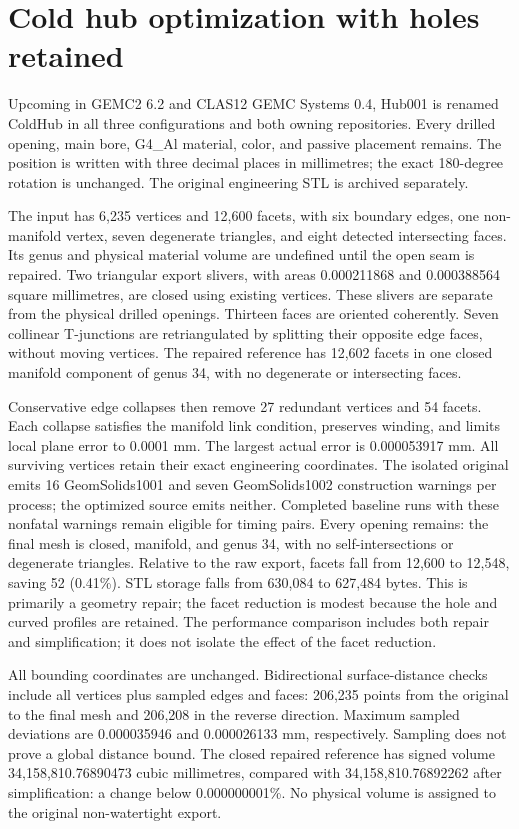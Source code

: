 \FloatBarrier
\section{Cold hub optimization with holes retained}
\label{sec:cold-hub}

Upcoming in GEMC2 6.2 and CLAS12 GEMC Systems 0.4, Hub001 is renamed ColdHub in all three configurations and
both owning repositories. Every drilled opening, main bore, G4\_Al material, color, and passive placement
remains. The position is written with three decimal places in millimetres; the exact 180-degree rotation is
unchanged. The original engineering STL is archived separately.

The input has 6,235 vertices and 12,600 facets, with six boundary edges, one non-manifold vertex, seven
degenerate triangles, and eight detected intersecting faces. Its genus and physical material volume are
undefined until the open seam is repaired. Two triangular export slivers, with areas 0.000211868 and
0.000388564 square millimetres, are closed using existing vertices. These slivers are separate from the
physical drilled openings. Thirteen faces are oriented coherently. Seven collinear T-junctions are
retriangulated by splitting their opposite edge faces, without moving vertices. The repaired reference has
12,602 facets in one closed manifold component of genus 34, with no degenerate or intersecting faces.

Conservative edge collapses then remove 27 redundant vertices and 54 facets. Each collapse satisfies the
manifold link condition, preserves winding, and limits local plane error to 0.0001 mm. The largest actual
error is 0.000053917 mm. All surviving vertices retain their exact engineering coordinates. The isolated
original emits 16 GeomSolids1001 and seven GeomSolids1002 construction warnings per process; the optimized
source emits neither. Completed baseline runs with these nonfatal warnings remain eligible for timing pairs.
Every opening remains: the final mesh is closed, manifold, and genus 34, with no self-intersections or
degenerate triangles. Relative to the raw export, facets fall from 12,600 to 12,548, saving 52 (0.41\%). STL
storage falls from 630,084 to 627,484 bytes. This is primarily a geometry repair; the facet reduction is
modest because the hole and curved profiles are retained. The performance comparison includes both repair and
simplification; it does not isolate the effect of the facet reduction.

All bounding coordinates are unchanged. Bidirectional surface-distance checks include all vertices plus
sampled edges and faces: 206,235 points from the original to the final mesh and 206,208 in the reverse
direction. Maximum sampled deviations are 0.000035946 and 0.000026133 mm, respectively. Sampling does not
prove a global distance bound. The closed repaired reference has signed volume 34,158,810.76890473 cubic
millimetres, compared with 34,158,810.76892262 after simplification: a change below 0.000000001\%. No physical
volume is assigned to the original non-watertight export.

